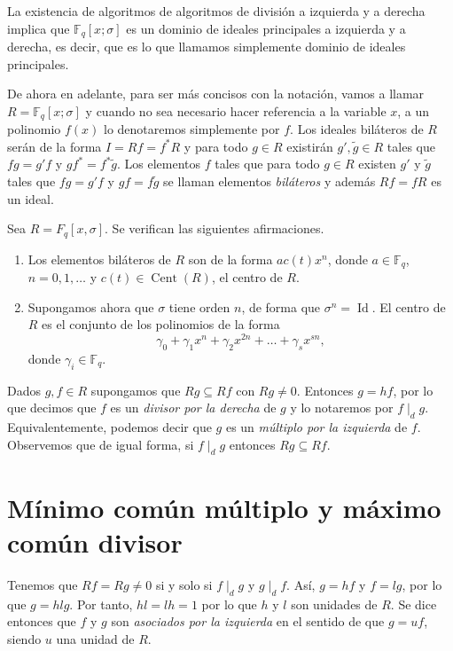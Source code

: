 La existencia de algoritmos de algoritmos de división a izquierda y a derecha implica que \(\mathbb F_q[x; \sigma]\) es un dominio de ideales principales a izquierda y a derecha, es decir, que es lo que llamamos simplemente dominio de ideales principales.

De ahora en adelante, para ser más concisos con la notación, vamos a llamar \(R = \mathbb F_q[x; \sigma]\) y cuando no sea necesario hacer referencia a la variable \(x\), a un polinomio \(f(x)\) lo denotaremos simplemente por \(f\).
Los ideales biláteros de \(R\) serán de la forma \(I = Rf = f^{*}R\) y para todo \(g \in R\) existirán \(g', \tilde{g} \in R\) tales que \(fg = g'f\) y \(gf^{*} = f^{*}\tilde{g}\).
Los elementos \(f\) tales que para todo \(g \in R\) existen \(g'\) y \(\tilde{g}\) tales que \(fg = g'f\) y \(gf = f\tilde{g}\) se llaman elementos \emph{biláteros} y además \(Rf = fR\) es un ideal.

\begin{theorem}
  \label{th:anillos-ore-centro}
  Sea \(R = F_q[x, \sigma]\). Se verifican las siguientes afirmaciones.
  \begin{enumerate}
    \item Los elementos biláteros de \(R\) son de la forma \(ac(t)x^n\), donde \(a \in \mathbb F_q\), \(n = 0, 1, \dots\) y \(c(t) \in \operatorname{Cent}(R)\), el centro de \(R\).
    \item Supongamos ahora que \(\sigma\) tiene orden \(n\), de forma que \(\sigma^n = \operatorname{Id}\).
    El centro de \(R\) es el conjunto de los polinomios de la forma
    \[
      \gamma_0 + \gamma_1x^{n} + \gamma_2x^{2n} + \dots + \gamma_sx^{sn},
    \]
    donde \(\gamma_i \in \mathbb F_q\).
  \end{enumerate}
\end{theorem}

Dados \(g, f \in R\) supongamos que \(Rg \subseteq Rf\) con \(Rg \neq 0\).
Entonces \(g = hf\), por lo que decimos que \(f\) es un \emph{divisor por la derecha} de \(g\) y lo notaremos por \(f \mid_{d} g\).
Equivalentemente, podemos decir que \(g\) es un \emph{múltiplo por la izquierda} de \(f\).
Observemos que de igual forma, si \(f \mid_{d} g\) entonces \(Rg \subseteq Rf\).

\section{Mínimo común múltiplo y máximo común divisor}

Tenemos que \(Rf = Rg \neq 0\) si y solo si \(f \mid_d g\) y \(g \mid_d f\).
Así, \(g = hf\) y \(f = lg\), por lo que \(g = hlg\).
Por tanto, \(hl = lh = 1\) por lo que \(h\) y \(l\) son unidades de \(R\).
Se dice entonces que \(f\) y \(g\) son \emph{asociados por la izquierda} en el sentido de que \(g = uf\), siendo \(u\) una unidad de \(R\).

